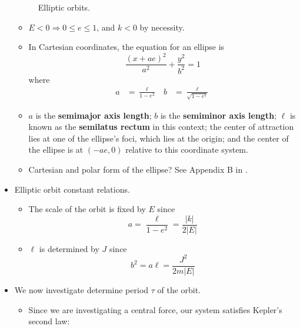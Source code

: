 \documentclass[../notes.tex]{subfiles}
\begin{document}
\begin{itemize}
\begin{figure}[h!]
        \caption{Elliptic orbits.}
        \label{fig:orbitsElliptic}
    \end{figure}
    \begin{itemize}
        \item $E<0\Longrightarrow 0\leq e\leq 1$, and $k<0$ by necessity.
        \item In Cartesian coordinates, the equation for an ellipse is
        \begin{equation*}
            \frac{(x+ae)^2}{a^2}+\frac{y^2}{b^2} = 1
        \end{equation*}
        where
        \begin{align*}
            a &= \frac{\ell}{1-e^2}&
            b &= \frac{\ell}{\sqrt{1-e^2}}
        \end{align*}
        \item $a$ is the \textbf{semimajor axis length}; $b$ is the \textbf{semiminor axis length}; $\ell$ is known as the \textbf{semilatus rectum} in this context; the center of attraction lies at one of the ellipse's foci, which lies at the origin; and the center of the ellipse is at $(-ae,0)$ relative to this coordinate system.
        \item Cartesian and polar form of the ellipse? See Appendix B in \textcite{bib:KibbleBerkshire}.
    \end{itemize}
    \item Elliptic orbit constant relations.
    \begin{itemize}
        \item The scale of the orbit is fixed by $E$ since
        \begin{equation*}
            a = \frac{\ell}{1-e^2} = \frac{|k|}{2|E|}
        \end{equation*}
        \item $\ell$ is determined by $J$ since
        \begin{equation*}
            b^2 = a\ell = \frac{J^2}{2m|E|}
        \end{equation*}
    \end{itemize}
    \item We now investigate determine period $\tau$ of the orbit.
    \begin{itemize}
        \item Since we are investigating a central force, our system satisfies Kepler's second law:
        \begin{equation*}

\end{equation*}
\end{itemize}
\end{itemize}
\end{document}
